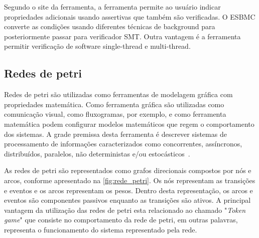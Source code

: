 \par
Segundo o site da ferramenta, a ferramenta permite ao usuário indicar propriedades adicionais usando assertivas que também são verificadas. O ESBMC converte as condições usando diferentes técnicas de background para posteriormente passar para verificador SMT. Outra vantagem é a ferramenta permitir verificação de software single-thread e multi-thread.


\subsection{Redes de petri}



Redes de petri são utilizadas como ferramentas de modelagem gráfica com propriedades matemática. Como ferramenta gráfica são utilizadas como comunicação visual, como fluxogramas, por exemplo, e como ferramenta matemática podem configurar modelos matemáticos que regem o comportamento dos sistemas. A grade premissa desta ferramenta é descrever sistemas de processamento de informações caracterizados como concorrentes, assíncronos, distribuídos, paralelos, não deterministas e/ou estocásticos~\cite{murata1989petri}.

\par
As redes de petri são representados como grafos direcionais compostos por nós e arcos, conforme apresentado na \autoref{fig:rede_petri}. Os nós representam as transições e eventos e os arcos representam os pesos. Dentro desta representação, os arcos e eventos são componentes passivos enquanto as transições são ativos. A principal vantagem da utilização das redes de petri esta relacionado ao chamado "\textit{Token game}" que consiste no comportamento da rede de petri, em outras palavras, representa o funcionamento do sistema representado pela rede\cite{halder2006}.

